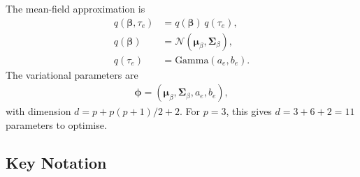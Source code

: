 \documentclass[11pt,a4paper]{article}
\newcommand{\N}{\mathcal{N}}
\begin{document}
The mean-field approximation is
\begin{align}
q(\bm{\beta}, \tau_e) &= q(\bm{\beta})\,q(\tau_e),\\
q(\bm{\beta}) &= \N(\bm{\mu}_\beta, \bm{\Sigma}_\beta),\\
q(\tau_e) &= \text{Gamma}(a_e, b_e).
\end{align}
The variational parameters are
\begin{align}
\bm{\phi} = (\bm{\mu}_\beta,\bm{\Sigma}_\beta,a_e,b_e),
\end{align}
with dimension $d=p+p(p+1)/2+2$. For $p=3$, this gives $d=3+6+2=11$ parameters to optimise.

\subsection{Key Notation}
\end{document}

